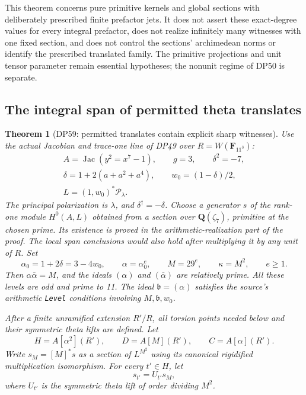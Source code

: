 \documentclass[11pt,a4paper]{article}
\newtheorem{theorem}{Theorem}[section]
\theoremstyle{definition}\newtheorem{remark}[theorem]{Remark}
\begin{document}
This theorem concerns pure primitive kernels and global sections with deliberately prescribed finite prefactor jets. It does not assert these exact-degree values for every integral prefactor, does not realize infinitely many witnesses with one fixed section, and does not control the sections' archimedean norms or identify the prescribed translated family. The primitive projections and unit tensor parameter remain essential hypotheses; the nonunit regime of DP50 is separate.


\subsection{The integral span of permitted theta translates}

\begin{theorem}[DP59: permitted translates contain explicit sharp witnesses]\label{DP59}
Use the actual Jacobian and trace-one line of DP49 over \(R=W(\mathbf F_{11^3})\): \[
 \begin{gathered}
 A=\operatorname{Jac}(y^2=x^7-1),\qquad g=3,\qquad \delta^2=-7,\\
 \delta=1+2(a+a^2+a^4),\qquad w_0=(1-\delta)/2,\\
 L=(1,w_0)^*\mathcal P_\lambda.
 \end{gathered}
\] The principal polarization is \(\lambda\), and \(\delta^\dagger=-\delta\). Choose a generator \(s\) of the rank-one module \(H^0(A,L)\) obtained from a section over \(\mathbf Q(\zeta_7)\), primitive at the chosen prime. Its existence is proved in the arithmetic-realization part of the proof. The local span conclusions would also hold after multiplying it by any unit of \(R\). Set \[
 \alpha_0=1+2\delta=3-4w_0,\qquad
 \alpha=\alpha_0^e,\qquad M=29^e,\qquad \kappa=M^2,
 \qquad e\ge1.
 \tag{TS1}
\] Then \(\alpha\bar\alpha=M\), and the ideals \((\alpha)\) and \((\bar\alpha)\) are relatively prime. All these levels are odd and prime to 11. The ideal \(\mathfrak b=(\alpha)\) satisfies the source's arithmetic \texttt{Level} conditions involving \(M,\mathfrak b,w_0\).

After a finite unramified extension \(R'/R\), all torsion points needed below and their symmetric theta lifts are defined. Let \[
 H=A[\alpha^2](R'),\qquad D=A[M](R'),\qquad C=A[\alpha](R').
 \tag{TS2}
\] Write \(s_M=[M]^*s\) as a section of \(L^{M^2}\) using its canonical rigidified multiplication isomorphism. For every \(t'\in H\), let \[
 s_{t'}=U_{t'}s_M,
 \tag{TS3}
\] where \(U_{t'}\) is the symmetric theta lift of order dividing \(M^2\).


\end{theorem}
\end{document}
